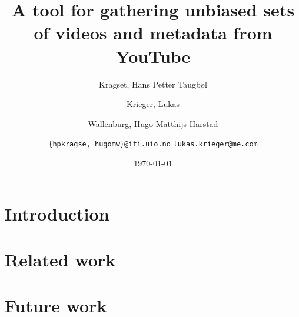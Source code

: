 \documentclass[10pt,journal]{IEEEtran}
\title{A tool for gathering unbiased sets of videos and metadata from YouTube}
\author{
	Kragset, Hans Petter Taugb\o l
	\and
	Krieger, Lukas
	\and
	Wallenburg, Hugo Matthijs Harstad
	\and
	\newline
	\texttt{\{hpkragse, hugomw\}@ifi.uio.no}
	\texttt{lukas.krieger@me.com}
}
\date{\today}
\begin{document}
\maketitle

\begin{abstract}
\end{abstract}

\section{Introduction}


\section{Related work}














\section{Future work}





%

\end{document}
